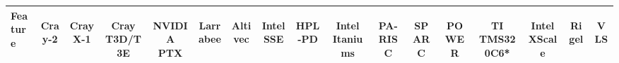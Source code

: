 \begin{landscape}
\begin{table}[p] 
\begin{small}
\begin{tabular}{|l|c|c|c||c|c|c|c||c|c||c|c|c||c|c||c|c|} 
\hline Feature & 
               {\begin{sideways}Cray-2\end{sideways}} & 
               {\begin{sideways}Cray X-1\end{sideways}} & 
               {\begin{sideways}Cray T3D/T3E\end{sideways}} & 
               
               {\begin{sideways}NVIDIA PTX\end{sideways}} & 
               {\begin{sideways}Larrabee\end{sideways}} & 
               {\begin{sideways}Altivec\end{sideways}} & 
               {\begin{sideways}Intel SSE\end{sideways}} & 
               
               {\begin{sideways}HPL-PD\end{sideways}} & 
               {\begin{sideways}Intel Itaniums\end{sideways}} & 
               
               {\begin{sideways}PA-RISC\end{sideways}} & 
               {\begin{sideways}SPARC\end{sideways}} & 
               {\begin{sideways}POWER\end{sideways}} & 
               
               {\begin{sideways}TI TMS320C6*\end{sideways}} &
               {\begin{sideways}Intel XScale\end{sideways}} & 
               
               {\begin{sideways}Rigel\end{sideways}} & 
               {\begin{sideways}VLS\end{sideways}} 
               \\ \hline \hline
               

\end{tabular}
\end{small}
\end{table}
\end{landscape}

